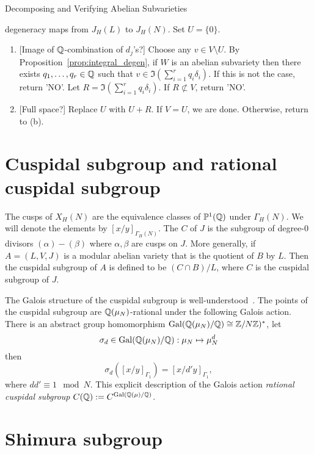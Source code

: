 \documentclass[11pt, proquest]{uwthesis}
\begin{document}
\begin{algorithm}{Decomposing and Verifying Abelian Subvarieties}
\begin{enumerate}
            degeneracy maps from $J_H(L)$ to $J_H(N)$.  Set $U=\{0\}$.
            \begin{enumerate}
                \item{} [Image of $\mathbb{Q}$-combination of $d_j$'s?]
                    Choose any $v\in V\setminus U$. By
                    Proposition~\ref{prop:integral_degen}, if $W$ is an abelian
                    subvariety then there exists $q_1,\ldots,q_r\in \mathbb{Q}$
                    such that $v\in \Im \left(\sum_{i=1} ^r q_i
                    \delta_i\right)$. If this is not the case, return
                    'NO'. Let $R = \Im \left(\sum_{i=1} ^r q_i
                    \delta_i\right)$. If $R\not\subset V$, return 'NO'.
                \item{} [Full space?]
                    Replace $U$ with $U+R$. If $V=U$, we are done. Otherwise,
                    return to (b).
            \end{enumerate}
    \end{enumerate}
\end{algorithm}
\section{Cuspidal subgroup and rational cuspidal subgroup}

The cusps of $X_H(N)$ are the equivalence classes of $\mathbb{P}^1(\mathbb{Q})$ under
$\Gamma_H(N)$. We will denote the elements by $[x/y]_{\Gamma_H(N)}$. The
 $C$ of $J$ is the subgroup of degree-0 divisors
$(\alpha)-(\beta)$ where $\alpha, \beta$ are cusps on $J$. More generally, if
$A=(L, V, J)$ is a modular abelian variety that is the quotient of $B$ by $L$.
Then the cuspidal subgroup of $A$ is defined to be $(C\cap B)/L$, where $C$ is
the cuspidal subgroup of $J$.

The Galois structure of the cuspidal subgroup is well-understood~\cite[\S
1.3]{stevens:thesis}. The points of the cuspidal subgroup are
$\mathbb{Q}(\mu_N)$-rational under the following Galois action. There is an abstract
group homomorphism $\operatorname{Gal}(\mathbb{Q}(\mu_N)/\mathbb{Q})\cong \mathbb{Z}/N\mathbb{Z})^*$, let
\[
    \sigma_d\in \operatorname{Gal}(\mathbb{Q}(\mu_N)/\mathbb{Q}):\mu_N\mapsto \mu_N ^d
\]
then
\[
    \sigma_d([x/y]_{\Gamma_1})=[x/d'y]_{\Gamma_1},
\]
where $dd'\equiv 1 \mod{N}$. This explicit description of the Galois action
\emph{rational cuspidal subgroup} $C(\mathbb{Q}):=C^{\operatorname{Gal}(\mathbb{Q}(\mu)/\mathbb{Q})}$.

\section{Shimura subgroup}
\end{document}
